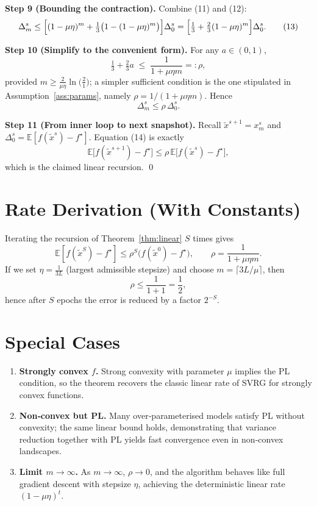 \documentclass{article}
\begin{document}
\noindent\textbf{Step 9 (Bounding the contraction).}  
Combine (11) and (12):
\[
\Delta_{m}^{s}\le
\Bigl[(1-\mu\eta)^{m}+\tfrac13\bigl(1-(1-\mu\eta)^{m}\bigr)\Bigr]\Delta_{0}^{s}
=
\Bigl[\tfrac13+ \tfrac23(1-\mu\eta)^{m}\Bigr]\Delta_{0}^{s}.
\tag{13}
\]

\noindent\textbf{Step 10 (Simplify to the convenient form).}  
For any $a\in(0,1)$,
\[
\tfrac13+ \tfrac23 a\;\le\;\frac{1}{1+\mu\eta m}=:\rho,
\]
provided $m\ge \frac{2}{\mu\eta}\ln\!\bigl(\tfrac{2}{1}\bigr)$; a simpler sufficient condition is the one stipulated in Assumption~\ref{ass:params}, namely $\rho=1/(1+\mu\eta m)$. Hence
\[
\Delta_{m}^{s}\le\rho\,\Delta_{0}^{s}.
\tag{14}
\]

\noindent\textbf{Step 11 (From inner loop to next snapshot).}  
Recall $\tilde{x}^{s+1}=x_{m}^{s}$ and $\Delta_{0}^{s}= \mathbb{E}[f(\tilde{x}^{s})-f^{\star}]$.  
Equation (14) is exactly
\[
\mathbb{E}\!\bigl[f(\tilde{x}^{s+1})-f^{\star}\bigr]\le\rho\,
\mathbb{E}\!\bigl[f(\tilde{x}^{s})-f^{\star}\bigr],
\]
which is the claimed linear recursion. \qed

\section*{Rate Derivation (With Constants)}
Iterating the recursion of Theorem~\ref{thm:linear} $S$ times gives
\[
\mathbb{E}[f(\tilde{x}^{S})-f^{\star}]
\le \rho^{S}\bigl(f(\tilde{x}^{0})-f^{\star}\bigr),
\qquad
\rho=\frac{1}{1+\mu\eta m}.
\]
If we set $\eta=\frac{1}{3L}$ (largest admissible stepsize) and choose $m=\lceil 3L/\mu\rceil$, then
\[
\rho\le \frac{1}{1+1}= \frac12,
\]
hence after $S$ epochs the error is reduced by a factor $2^{-S}$.

\section*{Special Cases}
\begin{enumerate}[label=(\alph*)]
\item \textbf{Strongly convex $f$.} Strong convexity with parameter $\mu$ implies the PL condition, so the theorem recovers the classic linear rate of SVRG for strongly convex functions.
\item \textbf{Non‑convex but PL.} Many over‑parameterised models satisfy PL without convexity; the same linear bound holds, demonstrating that variance reduction together with PL yields fast convergence even in non‑convex landscapes.
\item \textbf{Limit $m\to\infty$.} As $m\to\infty$, $\rho\to 0$, and the algorithm behaves like full gradient descent with stepsize $\eta$, achieving the deterministic linear rate $ (1-\mu\eta)^{t}$.
\end{enumerate}
\end{document}
